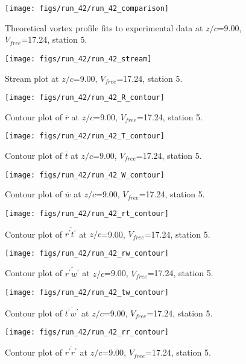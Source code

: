 \begin{figure}[H]
\centering
\texttt{[image: figs/run\_42/run\_42\_comparison]}
\caption{Theoretical vortex profile fits to experimental data at $z/c$=9.00, $V_{free}$=17.24, station 5.}
\end{figure}


\begin{figure}[H]
\centering
\texttt{[image: figs/run\_42/run\_42\_stream]}
\caption{Stream plot at $z/c$=9.00, $V_{free}$=17.24, station 5.}
\end{figure}


\begin{figure}[H]
\centering
\texttt{[image: figs/run\_42/run\_42\_R\_contour]}
\caption{Contour plot of $\overline{r}$ at $z/c$=9.00, $V_{free}$=17.24, station 5.}
\end{figure}


\begin{figure}[H]
\centering
\texttt{[image: figs/run\_42/run\_42\_T\_contour]}
\caption{Contour plot of $\overline{t}$ at $z/c$=9.00, $V_{free}$=17.24, station 5.}
\end{figure}


\begin{figure}[H]
\centering
\texttt{[image: figs/run\_42/run\_42\_W\_contour]}
\caption{Contour plot of $\overline{w}$ at $z/c$=9.00, $V_{free}$=17.24, station 5.}
\end{figure}


\begin{figure}[H]
\centering
\texttt{[image: figs/run\_42/run\_42\_rt\_contour]}
\caption{Contour plot of $\overline{r^\prime t^\prime}$ at $z/c$=9.00, $V_{free}$=17.24, station 5.}
\end{figure}


\begin{figure}[H]
\centering
\texttt{[image: figs/run\_42/run\_42\_rw\_contour]}
\caption{Contour plot of $\overline{r^\prime w^\prime}$ at $z/c$=9.00, $V_{free}$=17.24, station 5.}
\end{figure}


\begin{figure}[H]
\centering
\texttt{[image: figs/run\_42/run\_42\_tw\_contour]}
\caption{Contour plot of $\overline{t^\prime w^\prime}$ at $z/c$=9.00, $V_{free}$=17.24, station 5.}
\end{figure}


\begin{figure}[H]
\centering
\texttt{[image: figs/run\_42/run\_42\_rr\_contour]}
\caption{Contour plot of $\overline{r^\prime r^\prime}$ at $z/c$=9.00, $V_{free}$=17.24, station 5.}
\end{figure}


